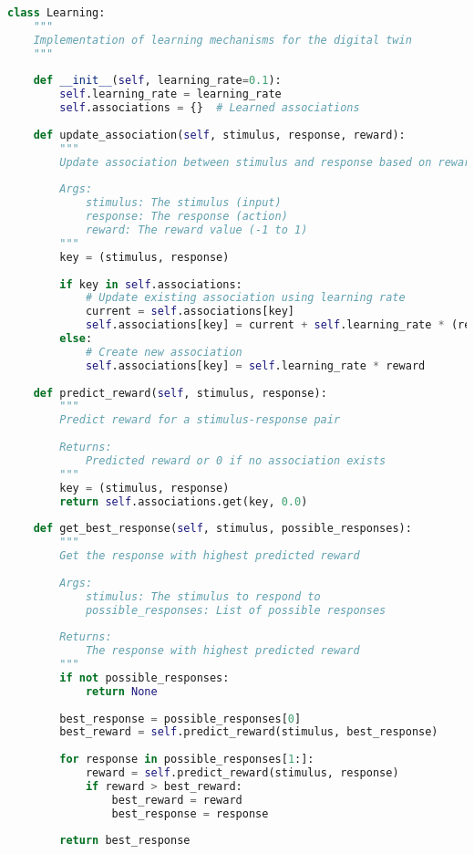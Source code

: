 \documentclass[11pt,a4paper]{article}
\begin{document}
\begin{lstlisting}[language=Python]
class Learning:
    """
    Implementation of learning mechanisms for the digital twin
    """
    
    def __init__(self, learning_rate=0.1):
        self.learning_rate = learning_rate
        self.associations = {}  # Learned associations
        
    def update_association(self, stimulus, response, reward):
        """
        Update association between stimulus and response based on reward
        
        Args:
            stimulus: The stimulus (input)
            response: The response (action)
            reward: The reward value (-1 to 1)
        """
        key = (stimulus, response)
        
        if key in self.associations:
            # Update existing association using learning rate
            current = self.associations[key]
            self.associations[key] = current + self.learning_rate * (reward - current)
        else:
            # Create new association
            self.associations[key] = self.learning_rate * reward
            
    def predict_reward(self, stimulus, response):
        """
        Predict reward for a stimulus-response pair
        
        Returns:
            Predicted reward or 0 if no association exists
        """
        key = (stimulus, response)
        return self.associations.get(key, 0.0)
        
    def get_best_response(self, stimulus, possible_responses):
        """
        Get the response with highest predicted reward
        
        Args:
            stimulus: The stimulus to respond to
            possible_responses: List of possible responses
            
        Returns:
            The response with highest predicted reward
        """
        if not possible_responses:
            return None
            
        best_response = possible_responses[0]
        best_reward = self.predict_reward(stimulus, best_response)
        
        for response in possible_responses[1:]:
            reward = self.predict_reward(stimulus, response)
            if reward > best_reward:
                best_reward = reward
                best_response = response
                
        return best_response
\end{lstlisting}
\end{document}
